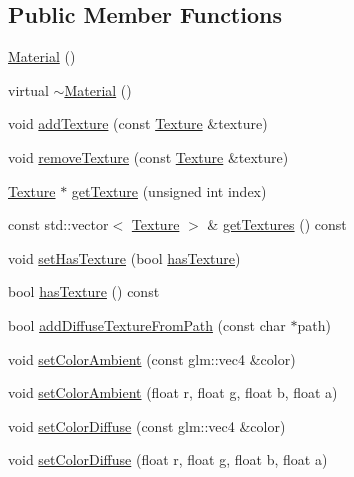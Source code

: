 \subsection*{Public Member Functions}
\begin{DoxyCompactItemize}
\item 
\mbox{\hyperlink{classec_1_1_material_a259d88ca352df2d284380f0b37052652}{Material}} ()
\item 
virtual \mbox{\hyperlink{classec_1_1_material_aec5bd3f3ef761f49a5028b415a9de52e}{$\sim$\+Material}} ()
\item 
void \mbox{\hyperlink{classec_1_1_material_aad92ada3fcc1f7b66e6bf3b6aeac73b8}{add\+Texture}} (const \mbox{\hyperlink{classec_1_1_texture}{Texture}} \&texture)
\item 
void \mbox{\hyperlink{classec_1_1_material_a83a673bcbcdef42bcea99939e5d6ff03}{remove\+Texture}} (const \mbox{\hyperlink{classec_1_1_texture}{Texture}} \&texture)
\item 
\mbox{\hyperlink{classec_1_1_texture}{Texture}} $\ast$ \mbox{\hyperlink{classec_1_1_material_a8679615f24284e809f213b882bec81bf}{get\+Texture}} (unsigned int index)
\item 
const std\+::vector$<$ \mbox{\hyperlink{classec_1_1_texture}{Texture}} $>$ \& \mbox{\hyperlink{classec_1_1_material_a95d74f12ec9d69a764a249e36b6b857c}{get\+Textures}} () const
\item 
void \mbox{\hyperlink{classec_1_1_material_a135ee01e9b085d0d78468e47b76bd17a}{set\+Has\+Texture}} (bool \mbox{\hyperlink{classec_1_1_material_a961612ff2caee16d5d4b8f9b74042cf2}{has\+Texture}})
\item 
bool \mbox{\hyperlink{classec_1_1_material_a961612ff2caee16d5d4b8f9b74042cf2}{has\+Texture}} () const
\item 
bool \mbox{\hyperlink{classec_1_1_material_a15b5c4adb903b16c25ad312963027924}{add\+Diffuse\+Texture\+From\+Path}} (const char $\ast$path)
\item 
void \mbox{\hyperlink{classec_1_1_material_afdd82441b5b2168161a17824e4a90f6f}{set\+Color\+Ambient}} (const glm\+::vec4 \&color)
\item 
void \mbox{\hyperlink{classec_1_1_material_a4ee41422a7625ac8a9f8a5e52bb18cf7}{set\+Color\+Ambient}} (float r, float g, float b, float a)
\item 
void \mbox{\hyperlink{classec_1_1_material_a22b711323a849e2ff6f9ffb871402a3e}{set\+Color\+Diffuse}} (const glm\+::vec4 \&color)
\item 
void \mbox{\hyperlink{classec_1_1_material_aa86e76b930ffffd45076465eff08bf27}{set\+Color\+Diffuse}} (float r, float g, float b, float a)

\end{DoxyCompactItemize}
